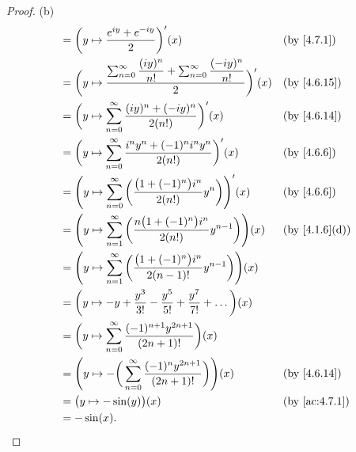 \begin{proof}{(b)}
\begin{align*}
     & = \bigg(y \mapsto \dfrac{e^{i y} + e^{- i y}}{2}\bigg)'(x)                                                                 &  & \by{4.7.1}                  \\
     & = \bigg(y \mapsto \dfrac{\sum_{n = 0}^\infty \dfrac{(i y)^n}{n!} + \sum_{n = 0}^\infty \dfrac{(- i y)^n}{n!}}{2}\bigg)'(x) &  & \by{4.6.15}                 \\
     & = \bigg(y \mapsto \sum_{n = 0}^\infty \dfrac{(i y)^n + (- i y)^n}{2 (n!)}\bigg)'(x)                                        &  & \by{4.6.14}                 \\
     & = \bigg(y \mapsto \sum_{n = 0}^\infty \dfrac{i^n y^n + (-1)^n i^n y^n}{2 (n!)}\bigg)'(x)                                   &  & \by{4.6.6}                  \\
     & = \Bigg(y \mapsto \sum_{n = 0}^\infty \bigg(\dfrac{\big(1 + (-1)^n\big) i^n}{2 (n!)} y^n\bigg)\Bigg)'(x)                   &  & \by{4.6.6}                  \\
     & = \Bigg(y \mapsto \sum_{n = 1}^\infty \bigg(\dfrac{n \big(1 + (-1)^n\big) i^n}{2 (n!)} y^{n - 1}\bigg)\Bigg)(x)            &  & \text{(by \cref{4.1.6}(d))} \\
     & = \Bigg(y \mapsto \sum_{n = 1}^\infty \bigg(\dfrac{\big(1 + (-1)^n\big) i^n}{2 (n - 1)!} y^{n - 1}\bigg)\Bigg)(x)                                           \\
     & = \bigg(y \mapsto -y + \dfrac{y^3}{3!} - \dfrac{y^5}{5!} + \dfrac{y^7}{7!} + \dots\bigg)(x)                                                                 \\
     & = \bigg(y \mapsto \sum_{n = 0}^\infty \dfrac{(-1)^{n + 1} y^{2n + 1}}{(2n + 1)!}\bigg)(x)                                                                   \\
     & = \Bigg(y \mapsto -\bigg(\sum_{n = 0}^\infty \dfrac{(-1)^n y^{2n + 1}}{(2n + 1)!}\bigg)\Bigg)(x)                           &  & \by{4.6.14}                 \\
     & = \big(y \mapsto -\sin(y)\big)(x)                                                                                          &  & \by{ac:4.7.1}               \\
     & = -\sin(x).
  \end{align*}
\end{proof}

